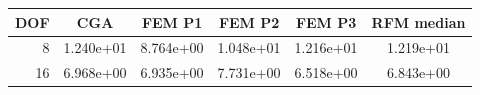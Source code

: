 \begin{tabular}{rccccc}
\toprule
DOF & CGA & FEM P1 & FEM P2 & FEM P3 & RFM median \\
\midrule
8 & 1.240e+01 & 8.764e+00 & 1.048e+01 & 1.216e+01 & 1.219e+01 \\
16 & 6.968e+00 & 6.935e+00 & 7.731e+00 & 6.518e+00 & 6.843e+00 \\
\bottomrule
\end{tabular}
